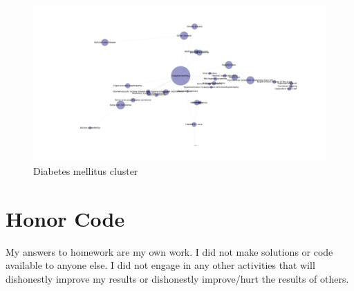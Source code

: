 \documentclass[a4paper,11pt]{article}
\begin{document}
\begin{figure}[h!]
\begin{center}
\includegraphics[scale=0.30]{diab.png}
\caption{Diabetes mellitus cluster}
\label{diab}
\end{center}
\end{figure}

\section*{Honor Code}


My answers to homework are my own work. I did not make solutions or code available to anyone else. I did not engage in any other activities that will dishonestly improve my results or dishonestly improve/hurt the results of others.
\end{document}
